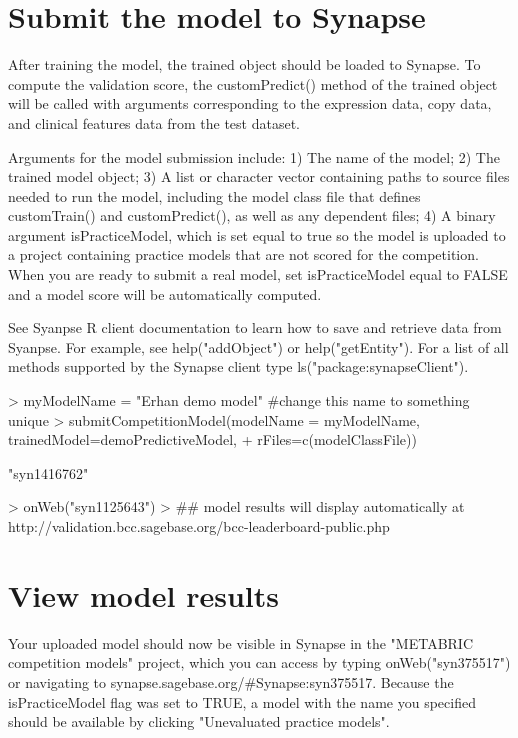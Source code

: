 \documentclass[10pt]{article}
\begin{document}
\section{Submit the model to Synapse}
After training the model, the trained object should be loaded to Synapse. To compute the validation score, the customPredict() method of the trained object will be called with arguments corresponding to the expression data, copy data, and clinical features data from the test dataset. 

Arguments for the model submission include: 1) The name of the model; 2) The trained model object; 3) A list or character vector containing paths to source files needed to run the model, including the model class file that defines customTrain() and customPredict(), as well as any dependent files; 4) A binary argument isPracticeModel, which is set equal to true so the model is uploaded to a project containing practice models that are not scored for the competition. When you are ready to submit a real model, set isPracticeModel equal to FALSE and a model score will be automatically computed.

See Syanpse R client documentation to learn how to save and retrieve data from Syanpse. For example, see help("addObject") or help("getEntity"). For a list of all methods supported by the Synapse client type ls("package:synapseClient").

\begin{Schunk}
\begin{Sinput}
> myModelName = "Erhan demo model" #change this name to something unique
> submitCompetitionModel(modelName = myModelName, trainedModel=demoPredictiveModel,
+                        rFiles=c(modelClassFile))
\end{Sinput}
\begin{Soutput}
[1] "syn1416762"
\end{Soutput}
\begin{Sinput}
> onWeb("syn1125643")
> ## model results will display automatically at http://validation.bcc.sagebase.org/bcc-leaderboard-public.php
\end{Sinput}
\end{Schunk}

\section{View model results}
Your uploaded model should now be visible in Synapse in the "METABRIC competition models" project, which you can access by typing onWeb("syn375517") or navigating to synapse.sagebase.org/\#Synapse:syn375517. Because the isPracticeModel flag was set to TRUE, a model with the name you specified should be available by clicking "Unevaluated practice models".
\end{document}
